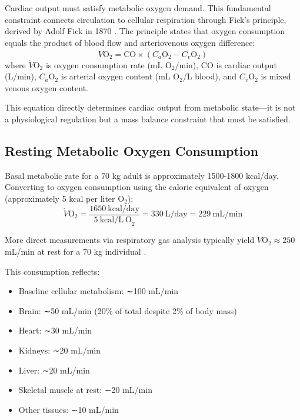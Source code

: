 \documentclass[10pt,twocolumn,a4paper]{article}
\theoremstyle{remark}
\begin{document}
Cardiac output must satisfy metabolic oxygen demand. This fundamental constraint connects circulation to cellular respiration through Fick's principle, derived by Adolf Fick in 1870 \cite{fick1870diffusion}. The principle states that oxygen consumption equals the product of blood flow and arteriovenous oxygen difference:
\begin{equation}
\dot{V}\mathrm{O}_{2} = \mathrm{CO} \times (C_{a}\mathrm{O}_{2} - C_{v}\mathrm{O}_{2})
\label{eq:fick}
\end{equation}
where $\dot{V}\mathrm{O}_{2}$ is oxygen consumption rate (mL O$_{2}$/min), CO is cardiac output (L/min), $C_{a}\mathrm{O}_{2}$ is arterial oxygen content (mL O$_{2}$/L blood), and $C_{v}\mathrm{O}_{2}$ is mixed venous oxygen content.

This equation directly determines cardiac output from metabolic state—it is not a physiological regulation but a mass balance constraint that must be satisfied.

\subsection{Resting Metabolic Oxygen Consumption}

Basal metabolic rate for a 70 kg adult is approximately 1500-1800 kcal/day. Converting to oxygen consumption using the caloric equivalent of oxygen (approximately 5 kcal per liter O$_{2}$):
\begin{equation}
\dot{V}\mathrm{O}_{2} = \frac{1650~\mathrm{kcal/day}}{5~\mathrm{kcal/L~O}_{2}} = 330~\mathrm{L/day} = 229~\mathrm{mL/min}
\end{equation}

More direct measurements via respiratory gas analysis typically yield $\dot{V}\mathrm{O}_{2} \approx 250$ mL/min at rest for a 70 kg individual \cite{weir1949new}.

This consumption reflects:
\begin{itemize}
\item Baseline cellular metabolism: ∼100 mL/min
\item Brain: ∼50 mL/min (20\% of total despite 2\% of body mass)
\item Heart: ∼30 mL/min
\item Kidneys: ∼20 mL/min
\item Liver: ∼20 mL/min
\item Skeletal muscle at rest: ∼20 mL/min
\item Other tissues: ∼10 mL/min
\end{itemize}
\end{document}
